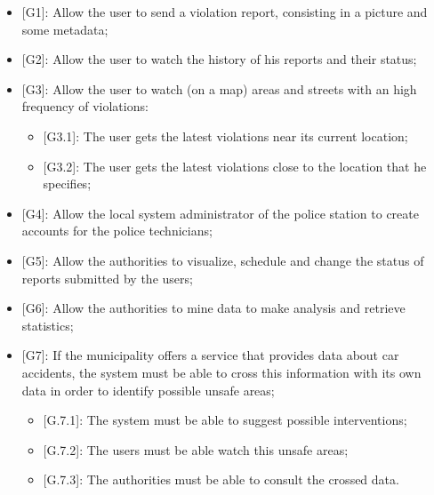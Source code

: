 \begin{itemize}  
  \item {[G1]}: Allow the user to send a violation report, consisting in a picture and some metadata;
  \item {[G2]}: Allow the user to watch the history of his reports and their status;
  \item {[G3]}: Allow the user to watch (on a map) areas and streets with an high frequency of violations:
  \begin{itemize}
    \item {[G3.1]}: The user gets the latest violations near its current location;
    \item {[G3.2]}: The user gets the latest violations close to the location that he specifies;
  \end{itemize} 
  \item {[G4]}: Allow the local system administrator of the police station to create accounts for the police technicians;
  \item {[G5]}: Allow the authorities to visualize, schedule and change the status of reports submitted by the users;
  \item {[G6]}: Allow the authorities to mine data to make analysis and retrieve statistics;
  \item {[G7]}: If the municipality offers a service that provides data about car accidents, the system must be able to cross this information with its own data in order to identify possible unsafe areas;
  \begin{itemize}
    \item {[G.7.1]}: The system must be able to suggest possible interventions;
    \item {[G.7.2]}: The users must be able watch this unsafe areas;
    \item {[G.7.3]}: The authorities must be able to consult the crossed data.
  \end{itemize} 
\end{itemize}
